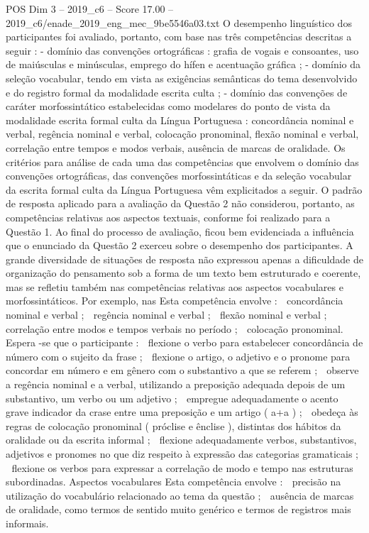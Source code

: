 \begin{textsample}{POS Dim 3 – 2019\_c6 – Score 17.00 – 2019\_c6/enade\_2019\_eng\_mec\_9be5546a03.txt}
O desempenho linguístico dos participantes foi avaliado, portanto, com base nas três competências descritas a seguir : - domínio das convenções ortográficas : grafia de vogais e consoantes, uso de maiúsculas e minúsculas, emprego do hífen e acentuação gráfica ; - domínio da seleção vocabular, tendo em vista as exigências semânticas do tema desenvolvido e do registro formal da modalidade escrita culta ; - domínio das convenções de caráter morfossintático estabelecidas como modelares do ponto de vista da modalidade escrita formal culta da Língua Portuguesa : concordância nominal e verbal, regência nominal e verbal, colocação pronominal, flexão nominal e verbal, correlação entre tempos e modos verbais, ausência de marcas de oralidade.
Os critérios para análise de cada uma das competências que envolvem o domínio das convenções ortográficas, das convenções morfossintáticas e da seleção vocabular da escrita formal culta da Língua Portuguesa vêm explicitados a seguir.
O padrão de resposta aplicado para a avaliação da Questão 2 não considerou, portanto, as competências relativas aos aspectos textuais, conforme foi realizado para a Questão 1.
Ao final do processo de avaliação, ficou bem evidenciada a influência que o enunciado da Questão 2 exerceu sobre o desempenho dos participantes.
A grande diversidade de situações de resposta não expressou apenas a dificuldade de organização do pensamento sob a forma de um texto bem estruturado e coerente, mas se refletiu também nas competências relativas aos aspectos vocabulares e morfossintáticos.
Por exemplo, nas Esta competência envolve :  concordância nominal e verbal ;  regência nominal e verbal ;  flexão nominal e verbal ;  correlação entre modos e tempos verbais no período ;  colocação pronominal.
Espera -se que o participante :  flexione o verbo para estabelecer concordância de número com o sujeito da frase ;  flexione o artigo, o adjetivo e o pronome para concordar em número e em gênero com o substantivo a que se referem ;  observe a regência nominal e a verbal, utilizando a preposição adequada depois de um substantivo, um verbo ou um adjetivo ;  empregue adequadamente o acento grave indicador da crase entre uma preposição e um artigo ( a+a ) ;  obedeça às regras de colocação pronominal ( próclise e ênclise ), distintas dos hábitos da oralidade ou da escrita informal ;  flexione adequadamente verbos, substantivos, adjetivos e pronomes no que diz respeito à expressão das categorias gramaticais ;  flexione os verbos para expressar a correlação de modo e tempo nas estruturas subordinadas.
Aspectos vocabulares Esta competência envolve :  precisão na utilização do vocabulário relacionado ao tema da questão ;  ausência de marcas de oralidade, como termos de sentido muito genérico e termos de registros mais informais.

\end{textsample}
